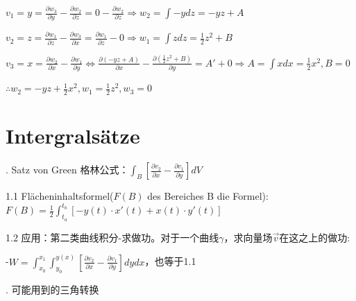 \documentclass[fleqn]{article}
\begin{document}
$v_1=y=\frac{\partial w_3}{\partial y} - \frac{\partial w_2}{\partial z}=0-\frac{\partial w_2}{\partial z}\Rightarrow w_2=\int -y dz=-yz+A$

$v_2=z=\frac{\partial w_1}{\partial z} - \frac{\partial w_3}{\partial x}=\frac{\partial w_1}{\partial z}-0\Rightarrow w_1=\int z dz=\frac{1}{2}z^2+B$

$v_3=x=\frac{\partial w_2}{\partial x} - \frac{\partial w_1}{\partial y}\Leftrightarrow \frac{\partial (-yz+A)}{\partial x}-\frac{\partial (\frac{1}{2}z^2+B)}{\partial y}=A'+0\Rightarrow A=\int xdx=\frac{1}{2}x^2,B=0$

$\therefore w_2=-yz+\frac{1}{2}x^2,w_1=\frac{1}{2}z^2,w_3=0$

\clearpage
\section{Intergralsätze}

. Satz von Green 格林公式：$\int_B[\frac{\partial v_2}{\partial x}-\frac{\partial v_1}{\partial y}]dV$

1.1 Flächeninhaltsformel($F(B)$ des Bereiches B die Formel): $F(B)=\frac{1}{2}\int_{t_a}^{t_b}[-y(t)\cdot x'(t)+x(t)\cdot y'(t)]$


1.2 应用：第二类曲线积分-求做功。对于一个曲线$\gamma$，求向量场$\vec{v}$在这之上的做功:

-$W=\int_{x_0}^{x_1} \int_{y_0}^{y(x)}[\frac{\partial v_2}{\partial x}-\frac{\partial v_1}{\partial y}]dydx$，也等于1.1

. 可能用到的三角转换
\end{document}
